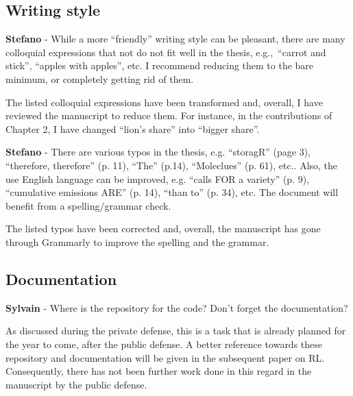 \documentclass[12pt,a4paper]{article}
\def\eg{e.g.,\ }
\begin{document}
\subsection{Writing style}
\label{writing_style}

\begin{mdframed}[style=comment] %
{\color{orange} \textbf{Stefano}} - While a more ``friendly'' writing style can be pleasant, there are many colloquial expressions that not do not fit well in the thesis, \eg ``carrot and stick'', ``apples with apples'', etc. I recommend reducing them to the bare minimum, or completely getting rid of them. 
\end{mdframed}

\noindent The listed colloquial expressions have been transformed and, overall, I have reviewed the manuscript to reduce them. For instance, {\color{blue} in the contributions of Chapter 2}, I have changed ``lion's share'' into ``bigger share''.

\begin{mdframed}[style=comment] %
{\color{orange} \textbf{Stefano}} - There are various typos in the thesis, e.g. ``storagR'' (page 3), ``therefore, therefore'' (p. 11), ``The'' (p.14), ``Moleclues'' (p. 61), etc.. Also, the use English language can be improved, e.g. ``calls FOR a variety'' (p. 9), ``cumulative emissions ARE'' (p. 14), ``than to'' (p. 34), etc. The document will benefit from a spelling/grammar check.
\end{mdframed}

\noindent The listed typos have been corrected and, overall, the manuscript has gone through Grammarly to improve the spelling and the grammar.

\subsection{Documentation}
\label{documentation}

\begin{mdframed}[style=comment] %
{\color{purple} \textbf{Sylvain}} - Where is the repository for the code? Don't forget the documentation?
\end{mdframed}

\noindent As discussed during the private defense, this is a task that is already planned for the year to come, after the public defense. A better reference towards these repository and documentation will be given in the subsequent paper on RL. Consequently, there has not been further work done in this regard in the manuscript by the public defense.
\end{document}
